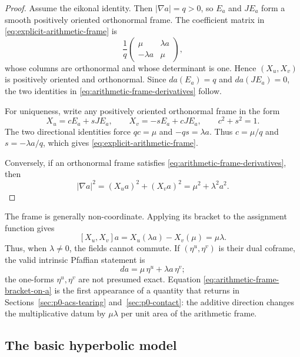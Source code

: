 \begin{proof}
Assume the eikonal identity.  Then $|\nabla a|=q>0$, so $E_a$ and $JE_a$ form a
smooth positively oriented orthonormal frame.  The coefficient matrix in
\eqref{eq:explicit-arithmetic-frame} is
\[
 \frac1q
 \begin{pmatrix}
  \mu&\lambda a\\
  -\lambda a&\mu
 \end{pmatrix},
\]
whose columns are orthonormal and whose determinant is one.  Hence
$(X_u,X_v)$ is positively oriented and orthonormal.  Since
$da(E_a)=q$ and $da(JE_a)=0$, the two identities in
\eqref{eq:arithmetic-frame-derivatives} follow.

For uniqueness, write any positively oriented orthonormal frame in the form
\[
 X_u=cE_a+sJE_a,
 \qquad
 X_v=-sE_a+cJE_a,
 \qquad c^2+s^2=1.
\]
The two directional identities force $qc=\mu$ and $-qs=\lambda a$.
Thus $c=\mu/q$ and $s=-\lambda a/q$, which gives
\eqref{eq:explicit-arithmetic-frame}.

Conversely, if an orthonormal frame satisfies
\eqref{eq:arithmetic-frame-derivatives}, then
\[
 |\nabla a|^2=(X_u a)^2+(X_v a)^2
 =\mu^2+\lambda^2a^2.
\]
\end{proof}

The frame is generally non-coordinate.  Applying its bracket to the assignment
function gives
\begin{equation}\label{eq:arithmetic-frame-bracket-on-a}
 [X_u,X_v]a
 =X_u(\lambda a)-X_v(\mu)
 =\mu\lambda.
\end{equation}
Thus, when $\lambda\ne0$, the fields cannot commute.  If
$(\eta^u,\eta^v)$ is their dual coframe, the valid intrinsic Pfaffian statement
is
\[
 da=\mu\,\eta^u+\lambda a\,\eta^v;
\]
the one-forms $\eta^u,\eta^v$ are not presumed exact.  Equation
\eqref{eq:arithmetic-frame-bracket-on-a} is the first appearance of a quantity
that returns in Sections~\ref{sec:p0-acs-tearing} and~\ref{sec:p0-contact}: the
additive direction changes the multiplicative datum by $\mu\lambda$ per unit
area of the arithmetic frame.

\subsection{The basic hyperbolic model}
\label{subsec:p0-basic-model}

